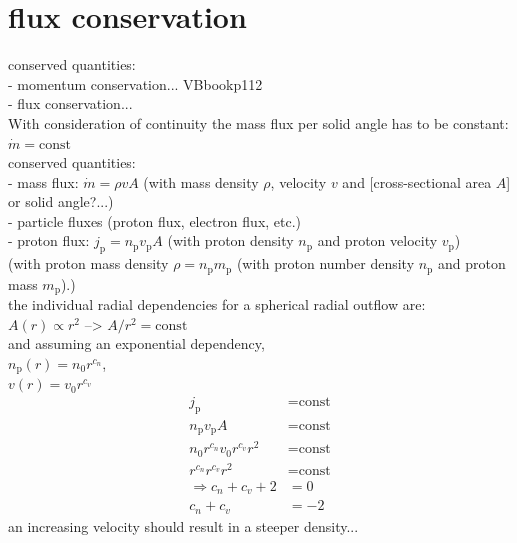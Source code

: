 \section{flux conservation}
conserved quantities:\\
- momentum conservation... VBbookp112\\
- flux conservation...\\



With consideration of continuity the mass flux per solid angle has to be constant: $\dot{m} = \text{const}$\\
conserved quantities:\\
- mass flux: $\dot{m} = \rho v A$ (with mass density $\rho$, velocity $v$ and [cross-sectional area $A$] or solid angle?...)\\
- particle fluxes (proton flux, electron flux, etc.)\\
	- proton flux: $j_\text{p} = n_\text{p} v_\text{p} A$ (with proton density $n_\text{p}$ and proton velocity $v_\text{p}$)\\

(with proton mass density $\rho = n_\text{p} m_\text{p}$ (with proton number density $n_\text{p}$ and proton mass $m_\text{p}$).)\\

the individual radial dependencies for a spherical radial outflow are:\\
$A(r) \propto r^2$ --> $A/r^2 = \text{const}$\\
and assuming an exponential dependency,\\
$n_{\text{p}}(r) = n_0 r^{c_n}$,\\
$v(r) = v_0 r^{c_v}$\\
\begin{align}
	j_\text{p} &= \text{const}\\
	n_\text{p} v_\text{p} A &= \text{const}\\
	n_0 r^{c_n} v_0 r^{c_v} r^2 &= \text{const}\\
	r^{c_n} r^{c_v} r^2 &= \text{const}\\
	\Rightarrow c_n + c_v + 2 &= 0\\
	c_n + c_v &= -2
\end{align}
an increasing velocity should result in a steeper density...\\

